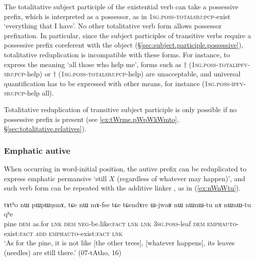 The totalitative subject participle of the existential verb  can take a possessive prefix, which is interpreted as a possessor, as in  \textsc{1sg}.\textsc{poss}-\textsc{total}\redp{}\textsc{sbj}:\textsc{pcp}-exist `everything that I have'. No other totalitative verb form allows possessor prefixation. In particular, since the subject participles of transitive verbs require a possessive prefix coreferent with the object (§\ref{sec:subject.participle.possessive}), totalitative reduplication is incompatible with these forms. For instance, to express the meaning `all those who help me', forms such as $\dagger$ (\textsc{1sg}.\textsc{poss}-\textsc{total}\redp{}\textsc{ipfv}-\textsc{sbj}:\textsc{pcp}-help) or $\dagger$ (\textsc{1sg}.\textsc{poss}-\textsc{total}\redp{}\textsc{sbj}:\textsc{pcp}-help) are unacceptable, and universal quantification has to be expressed with other means, for instance  (\textsc{1sg}.\textsc{poss}-\textsc{ipfv}-\textsc{sbj}:\textsc{pcp}-help all).

Totalitative reduplication of transitive subject participle is only possible if no possessive prefix is present (see \ref{ex:tWrme.pWpWkWmto}, §\ref{sec:totalitative.relatives}).

 

\subsubsection{Emphatic autive}  \label{sec:emphatic.autive}
When occurring in word-initial position, the  autive prefix  can be reduplicated to express emphatic permansive `still $X$ (regardless of whatever may happen)', and such verb form can be repeated with the additive linker , as in (\ref{ex:nWnWtu}).

\begin{exe}
\ex \label{ex:nWnWtu}
\gll tɤtʰo nɯ pɯpɯŋunɤ, tɕe nɯ mɤ-fse tɕe tɕendɤre ɯ-jwaʁ nɯ nɯ\redp{}nɯ-tu nɤ nɯ\redp{}nɯ-tu qʰe \\
pine \textsc{dem} as.for \textsc{lnk} \textsc{dem} \textsc{neg}-be.like:\textsc{fact} \textsc{lnk}  \textsc{lnk} \textsc{3sg}.\textsc{poss}-leaf \textsc{dem} \textsc{emph}\redp{}\textsc{auto}-exist:\textsc{fact} \textsc{add} \textsc{emph}\redp{}\textsc{auto}-exist:\textsc{fact} \textsc{lnk} \\
\glt `As for the pine, it is not like [the other trees], [whatever happens], its leaves (needles) are still there.'  (07-tAtho, 16)
\end{exe}

